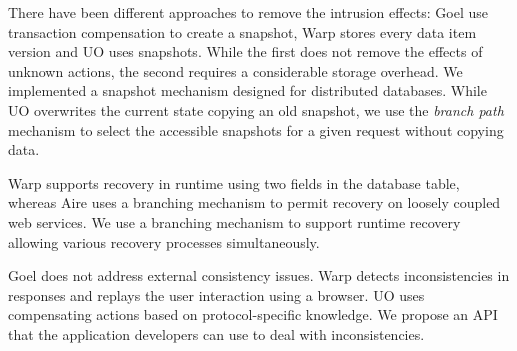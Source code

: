 There have been different approaches to remove the intrusion effects: Goel use transaction compensation to create a snapshot, Warp stores every data item version and UO uses snapshots. While the first does not remove the effects of unknown actions, the second requires a considerable storage overhead. We implemented a snapshot mechanism designed for distributed databases. While UO overwrites the current state copying an old snapshot, we use the \textit{branch path} mechanism to select the accessible snapshots for a given request without copying data.

Warp supports recovery in runtime using two fields in the database table, whereas Aire uses a branching mechanism to permit recovery on loosely coupled web services. We use a branching mechanism to support runtime recovery allowing various recovery processes simultaneously. 

Goel does not address external consistency issues. Warp \cite{warp} detects inconsistencies in responses and replays the user interaction using a browser. UO uses compensating actions based on protocol-specific knowledge. We propose an API that the application developers can use to deal with inconsistencies.

